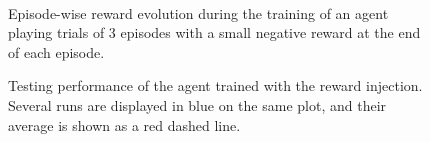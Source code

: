 \begin{figure}
	\centering
	\\
	\caption{Episode-wise reward evolution during the training of an
	agent playing trials of 3 episodes with a small negative reward
	at the end of each episode.}
	\label{fig:magic}
\end{figure}

\begin{figure}
	\centering
	\caption{Testing performance of the agent trained with the reward
	injection. Several runs are displayed in blue on the same plot, and their
	average is shown as a red dashed line.}
	\label{fig:magic_rewards}
\end{figure}

